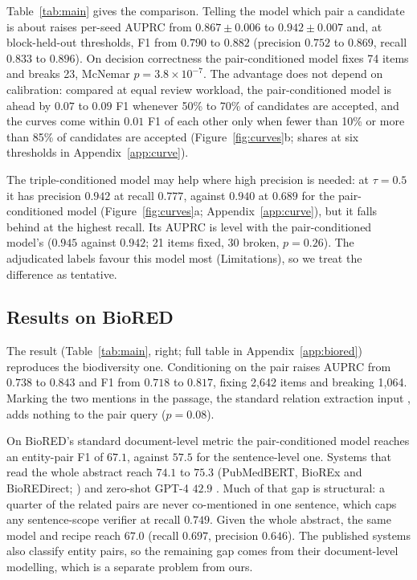 \documentclass[11pt]{article}
\begin{document}
Table~\ref{tab:main} gives the comparison. Telling the model which pair a candidate is about raises
per-seed AUPRC from $0.867 \pm 0.006$ to $0.942 \pm 0.007$ and, at block-held-out thresholds, F1
from $0.790$ to $0.882$ (precision $0.752$ to $0.869$, recall $0.833$ to $0.896$). On decision
correctness the pair-conditioned model fixes 74 items and breaks 23, McNemar
$p = 3.8\times10^{-7}$. The advantage does not depend on calibration: compared at equal review
workload, the pair-conditioned model is ahead by $0.07$ to $0.09$ F1 whenever 50\% to 70\% of candidates are accepted, and the curves come within $0.01$ F1 of each other only when fewer than 10\% or more than 85\% of candidates are accepted (Figure~\ref{fig:curves}b; shares at six thresholds in Appendix~\ref{app:curve}).

The triple-conditioned model may help where high precision is needed: at $\tau = 0.5$ it has precision $0.942$ at recall $0.777$, against $0.940$ at $0.689$ for the pair-conditioned model (Figure~\ref{fig:curves}a; Appendix~\ref{app:curve}), but it falls behind at the highest recall. Its AUPRC is level with the pair-conditioned model's ($0.945$ against $0.942$; 21 items fixed, 30 broken, $p = 0.26$). The adjudicated labels favour this model most (Limitations), so we treat the difference as tentative.

\subsection{Results on BioRED}
\label{sec:biored}

The result (Table~\ref{tab:main}, right; full table in Appendix~\ref{app:biored}) reproduces the
biodiversity one. Conditioning on the pair raises AUPRC from $0.738$ to $0.843$ and F1 from $0.718$
to $0.817$, fixing 2{,}642 items and breaking 1{,}064. Marking the two mentions in the passage, the
standard relation extraction input \citep{zhou2022improved}, adds nothing to the pair query
($p = 0.08$).

On BioRED's standard document-level metric the pair-conditioned model reaches an entity-pair F1 of
$67.1$, against $57.5$ for the sentence-level one. Systems that read the whole abstract reach
$74.1$ to $75.3$ (PubMedBERT, BioREx and BioREDirect; \citealp{lai2023biorex,lai2025bioredirect})
and zero-shot GPT-4 $42.9$ \citep{islamaj2024overview}. Much of that gap is structural: a quarter of
the related pairs are never co-mentioned in one sentence, which caps any sentence-scope verifier at
recall $0.749$. Given the whole abstract, the same model and recipe reach $67.0$ (recall $0.697$,
precision $0.646$). The published systems also classify entity pairs, so the remaining gap comes from their document-level modelling, which is a separate problem from ours.
\end{document}
